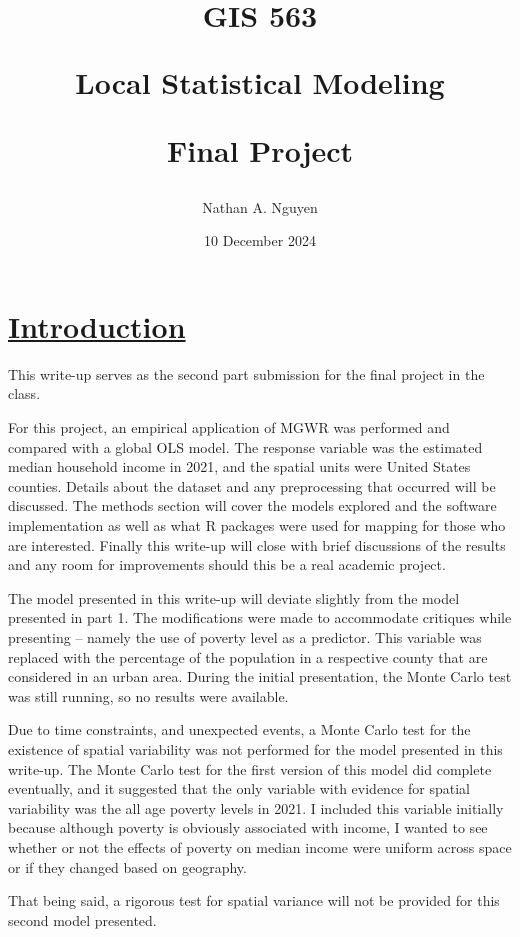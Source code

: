 \documentclass[
]{article}
\title{\vspace{5cm}

GIS 563

Local Statistical Modeling

Final Project}
\author{Nathan A. Nguyen}
\date{10 December 2024}
\begin{document}
\maketitle

\newpage

\section{\texorpdfstring{\ul{Introduction}}{Introduction}}\label{introduction}

This write-up serves as the second part submission for the final project
in the class.

For this project, an empirical application of MGWR was performed and
compared with a global OLS model. The response variable was the
estimated median household income in 2021, and the spatial units were
United States counties. Details about the dataset and any preprocessing
that occurred will be discussed. The methods section will cover the
models explored and the software implementation as well as what R
packages were used for mapping for those who are interested. Finally
this write-up will close with brief discussions of the results and any
room for improvements should this be a real academic project.

The model presented in this write-up will deviate slightly from the
model presented in part 1. The modifications were made to accommodate
critiques while presenting -- namely the use of poverty level as a
predictor. This variable was replaced with the percentage of the
population in a respective county that are considered in an urban area.
During the initial presentation, the Monte Carlo test was still running,
so no results were available.

Due to time constraints, and unexpected events, a Monte Carlo test for
the existence of spatial variability was not performed for the model
presented in this write-up. The Monte Carlo test for the first version
of this model did complete eventually, and it suggested that the only
variable with evidence for spatial variability was the all age poverty
levels in 2021. I included this variable initially because although
poverty is obviously associated with income, I wanted to see whether or
not the effects of poverty on median income were uniform across space or
if they changed based on geography.

That being said, a rigorous test for spatial variance will not be
provided for this second model presented.

\newpage
\end{document}
